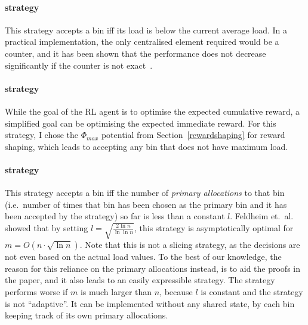 \paragraph{\MeanThinning strategy}
This strategy accepts a bin iff its load is below the current average load. In a practical implementation, the only centralised element required would be a counter, and it has been shown that the performance does not decrease significantly if the counter is not exact~\cite{los2022cachingpackingthinningtwinning}. 


\paragraph{\LocalRewardOptimiser strategy}

While the goal of the RL agent is to optimise the expected cumulative reward, a simplified goal can be optimising the expected immediate reward. For this strategy, I chose the $\Phi_{max}$ potential from Section~\ref{rewardshaping} for reward shaping, which leads to accepting any bin that does not have maximum load.


\paragraph{\Threshold strategy \protect\footnotemark[1]} 



This strategy accepts a bin iff the number of \textit{primary allocations} to that bin (i.e.\ number of times that bin has been chosen as the primary bin and it has been accepted by the strategy) so far is less than a constant $l$. Feldheim et.\ al.~\cite{feldheim2021thinning} showed that by setting $l=\sqrt{\frac{2\ln n}{\ln \ln n}}$, this strategy is asymptotically optimal for $m = O(n \cdot \sqrt{\ln n})$. Note that this is not a slicing strategy, as the decisions are not even based on the actual load values. To the best of our knowledge, the reason for this reliance on the primary allocations instead, is to aid the proofs in the paper, and it also leads to an easily expressible strategy. The strategy performs worse if $m$ is much larger than $n$, because $l$ is constant and the strategy is not ``adaptive''. It can be implemented without any shared state, by each bin keeping track of its own primary allocations.

\section{\KThinning}

